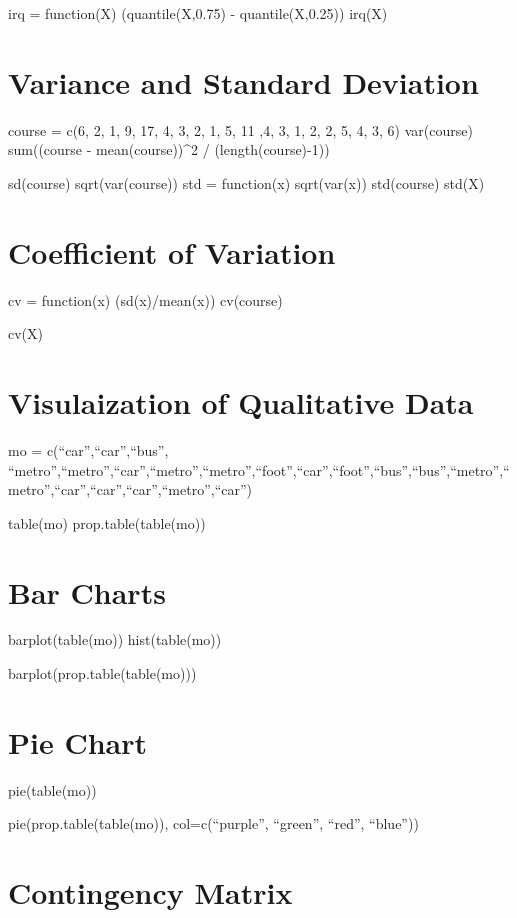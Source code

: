 \documentclass[
]{article}
\begin{document}
irq = function(X) (quantile(X,0.75) - quantile(X,0.25)) irq(X)

\section{Variance and Standard
Deviation}\label{variance-and-standard-deviation}

course = c(6, 2, 1, 9, 17, 4, 3, 2, 1, 5, 11 ,4, 3, 1, 2, 2, 5, 4, 3, 6)
var(course) sum((course - mean(course))\^{}2 / (length(course)-1))

sd(course) sqrt(var(course)) std = function(x) sqrt(var(x)) std(course)
std(X)

\section{Coefficient of Variation}\label{coefficient-of-variation}

cv = function(x) (sd(x)/mean(x)) cv(course)

cv(X)

\section{Visulaization of Qualitative
Data}\label{visulaization-of-qualitative-data}

mo = c(``car'',``car'',``bus'',
``metro'',``metro'',``car'',``metro'',``metro'',``foot'',``car'',``foot'',``bus'',``bus'',``metro'',``metro'',``car'',``car'',``car'',``metro'',``car'')

table(mo) prop.table(table(mo))

\section{Bar Charts}\label{bar-charts}

barplot(table(mo)) hist(table(mo))

barplot(prop.table(table(mo)))

\section{Pie Chart}\label{pie-chart}

pie(table(mo))

pie(prop.table(table(mo)), col=c(``purple'', ``green'', ``red'',
``blue''))

\section{Contingency Matrix}\label{contingency-matrix}
\end{document}
